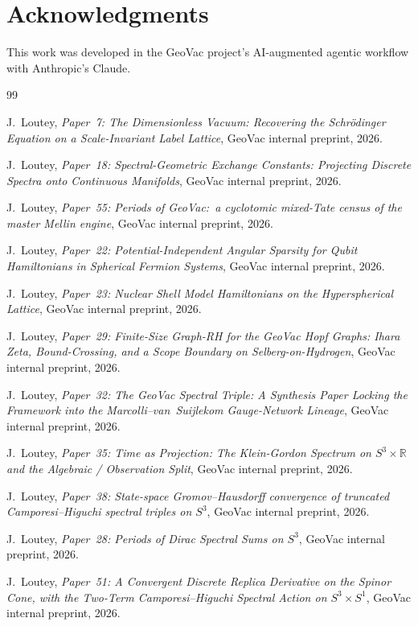 \documentclass[11pt,a4paper]{article}
\theoremstyle{plain}
\theoremstyle{definition}
\begin{document}
\section*{Acknowledgments}

This work was developed in the GeoVac project's AI-augmented
agentic workflow with Anthropic's Claude.

\begin{thebibliography}{99}

 J.~Loutey,
\emph{Paper~7: The Dimensionless Vacuum: Recovering the Schr\"odinger
Equation on a Scale-Invariant Label Lattice},
GeoVac internal preprint, 2026.

 J.~Loutey,
\emph{Paper~18: Spectral-Geometric Exchange Constants: Projecting
Discrete Spectra onto Continuous Manifolds},
GeoVac internal preprint, 2026.

 J.~Loutey,
\emph{Paper~55: Periods of GeoVac:\ a cyclotomic mixed-Tate census of
the master Mellin engine},
GeoVac internal preprint, 2026.

 J.~Loutey,
\emph{Paper~22: Potential-Independent Angular Sparsity for Qubit
Hamiltonians in Spherical Fermion Systems},
GeoVac internal preprint, 2026.

 J.~Loutey,
\emph{Paper~23: Nuclear Shell Model Hamiltonians on the Hyperspherical Lattice},
GeoVac internal preprint, 2026.

 J.~Loutey,
\emph{Paper~29: Finite-Size Graph-RH for the GeoVac Hopf Graphs: Ihara Zeta, Bound-Crossing, and a Scope Boundary on Selberg-on-Hydrogen},
GeoVac internal preprint, 2026.

 J.~Loutey,
\emph{Paper~32: The GeoVac Spectral Triple: A Synthesis Paper Locking
the Framework into the Marcolli--van~Suijlekom Gauge-Network Lineage},
GeoVac internal preprint, 2026.

 J.~Loutey,
\emph{Paper~35: Time as Projection: The Klein-Gordon Spectrum on
$S^3 \times \mathbb{R}$ and the Algebraic / Observation Split},
GeoVac internal preprint, 2026.

 J.~Loutey,
\emph{Paper~38: State-space Gromov--Hausdorff convergence of truncated Camporesi--Higuchi spectral triples on $S^3$},
GeoVac internal preprint, 2026.

 J.~Loutey,
\emph{Paper~28: Periods of Dirac Spectral Sums on $S^3$},
GeoVac internal preprint, 2026.

 J.~Loutey,
\emph{Paper~51: A Convergent Discrete Replica Derivative on the Spinor
Cone, with the Two-Term Camporesi--Higuchi Spectral Action on
$S^3 \times S^1$},
GeoVac internal preprint, 2026.


\end{thebibliography}
\end{document}
